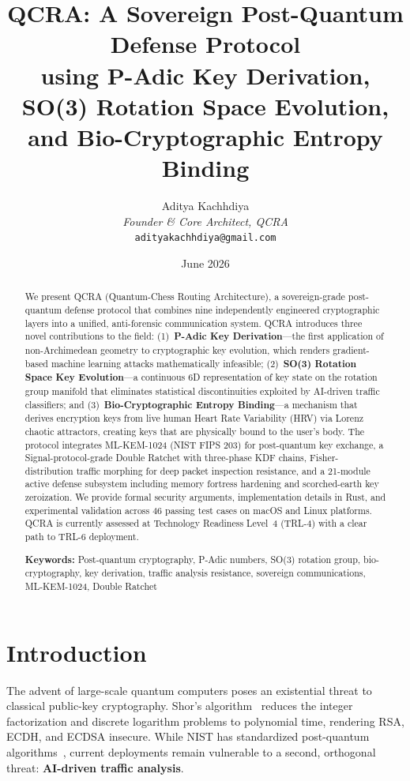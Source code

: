 \documentclass[11pt,a4paper]{article}
\title{%
  \textbf{QCRA: A Sovereign Post-Quantum Defense Protocol\\
  using P-Adic Key Derivation, SO(3) Rotation Space Evolution,\\
  and Bio-Cryptographic Entropy Binding}%
}
\author{%
  Aditya Kachhdiya\\
  \textit{Founder \& Core Architect, QCRA}\\
  \texttt{adityakachhdiya@gmail.com}
}
\date{June 2026}
\begin{document}
\maketitle

\begin{abstract}
We present QCRA (Quantum-Chess Routing Architecture), a sovereign-grade
post-quantum defense protocol that combines nine independently engineered
cryptographic layers into a unified, anti-forensic communication system.
QCRA introduces three novel contributions to the field: (1)~\textbf{P-Adic
Key Derivation}---the first application of non-Archimedean geometry to
cryptographic key evolution, which renders gradient-based machine learning
attacks mathematically infeasible; (2)~\textbf{SO(3) Rotation Space Key
Evolution}---a continuous 6D representation of key state on the rotation
group manifold that eliminates statistical discontinuities exploited by
AI-driven traffic classifiers; and (3)~\textbf{Bio-Cryptographic Entropy
Binding}---a mechanism that derives encryption keys from live human Heart
Rate Variability (HRV) via Lorenz chaotic attractors, creating keys that
are physically bound to the user's body. The protocol integrates ML-KEM-1024
(NIST FIPS 203) for post-quantum key exchange, a Signal-protocol-grade
Double Ratchet with three-phase KDF chains, Fisher-distribution traffic
morphing for deep packet inspection resistance, and a 21-module active
defense subsystem including memory fortress hardening and scorched-earth
key zeroization. We provide formal security arguments, implementation
details in Rust, and experimental validation across 46 passing test cases
on macOS and Linux platforms. QCRA is currently assessed at Technology
Readiness Level~4 (TRL-4) with a clear path to TRL-6 deployment.

\medskip
\noindent\textbf{Keywords:} Post-quantum cryptography, P-Adic numbers,
SO(3) rotation group, bio-cryptography, key derivation, traffic analysis
resistance, sovereign communications, ML-KEM-1024, Double Ratchet
\end{abstract}

\section{Introduction}
\label{sec:intro}

The advent of large-scale quantum computers poses an existential threat to
classical public-key cryptography. Shor's algorithm~\cite{shor1997} reduces
the integer factorization and discrete logarithm problems to polynomial
time, rendering RSA, ECDH, and ECDSA insecure. While NIST has standardized
post-quantum algorithms~\cite{nist2024fips203}, current deployments remain
vulnerable to a second, orthogonal threat: \textbf{AI-driven traffic
analysis}.
\end{document}

